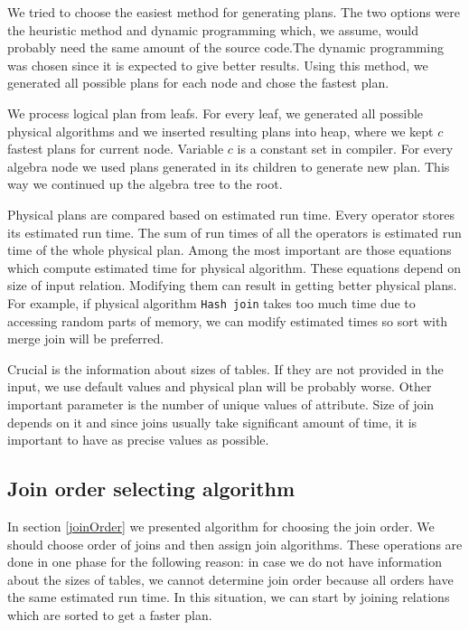 We tried to choose the easiest method for generating plans. The two options were the heuristic method and dynamic programming which, we assume, would probably need the same amount of the source code.The dynamic programming was chosen since it is expected to give better results. Using this method, we generated all possible plans for each node and chose the fastest plan.

We process logical plan from leafs. For every leaf, we generated all possible physical algorithms and we inserted resulting plans into heap, where we kept $c$ fastest plans for current node. Variable $c$ is a constant set in compiler.
For every algebra node we used plans generated in its children to generate new plan. This way we continued up the algebra tree to the root.

Physical plans are compared based on estimated run time. Every operator stores its estimated run time. The sum of run times of all the operators is estimated run time of the whole physical plan.
Among the most important are those equations which compute estimated time for physical algorithm. These equations depend on size of input relation. Modifying them can result in getting better physical plans. For example, if physical algorithm \texttt{Hash join} takes too much time due to accessing random parts of memory, we can modify estimated times so sort with merge join will be preferred.

Crucial is the information about sizes of tables. If they are not provided in the input, we use default values and physical plan will be probably worse. Other important parameter is the number of unique values of attribute. Size of join depends on it and since joins usually take significant amount of time, it is important to have as precise values as possible. 

\subsection{Join order selecting algorithm}


In section \ref{joinOrder} we presented algorithm for choosing the join order. We should choose order of joins and then assign join algorithms. These operations are done in one phase for the following reason: in case we do not have information about the sizes of tables, we cannot determine join order because all orders have the same estimated run time. In this situation, we can start by joining relations which are sorted to get a faster plan.

